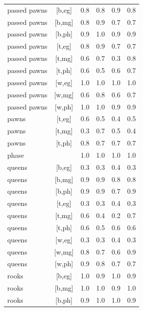 \documentclass{article}
\begin{document}
\begin{longtable}{lcrrrr}
 passed pawns & [b,eg] &      0.8 &      0.8 &      0.9 &      0.8 \\
 passed pawns & [b,mg] &      0.8 &      0.9 &      0.7 &      0.7 \\
 passed pawns & [b,ph] &      0.9 &      1.0 &      0.9 &      0.9 \\
 passed pawns & [t,eg] &      0.8 &      0.9 &      0.7 &      0.7 \\
 passed pawns & [t,mg] &      0.6 &      0.7 &      0.3 &      0.8 \\
 passed pawns & [t,ph] &      0.6 &      0.5 &      0.6 &      0.7 \\
 passed pawns & [w,eg] &      1.0 &      1.0 &      1.0 &      1.0 \\
 passed pawns & [w,mg] &      0.6 &      0.8 &      0.6 &      0.7 \\
 passed pawns & [w,ph] &      1.0 &      1.0 &      0.9 &      0.9 \\
 pawns & [t,eg] &      0.6 &      0.5 &      0.4 &      0.5 \\
 pawns & [t,mg] &      0.3 &      0.7 &      0.5 &      0.4 \\
 pawns & [t,ph] &      0.8 &      0.7 &      0.7 &      0.7 \\
 phase &   &   1.0 &      1.0 &      1.0 &      1.0 \\
queens & [b,eg] &      0.3 &      0.3 &      0.4 &      0.3 \\
queens & [b,mg] &      0.9 &      0.9 &      0.8 &      0.8 \\
queens & [b,ph] &      0.9 &      0.9 &      0.7 &      0.9 \\
queens & [t,eg] &      0.3 &      0.3 &      0.4 &      0.3 \\
queens & [t,mg] &      0.6 &      0.4 &      0.2 &      0.7 \\
queens & [t,ph] &      0.6 &      0.5 &      0.6 &      0.6 \\
queens & [w,eg] &      0.3 &      0.3 &      0.4 &      0.3 \\
queens & [w,mg] &      0.8 &      0.7 &      0.6 &      0.9 \\
queens & [w,ph] &      0.9 &      0.8 &      0.7 &      0.7 \\
 rooks & [b,eg] &      1.0 &      0.9 &      1.0 &      0.9 \\
 rooks & [b,mg] &      1.0 &      1.0 &      0.9 &      1.0 \\
 rooks & [b,ph] &      0.9 &      1.0 &      1.0 &      0.9 \\

\end{longtable}
\end{document}
